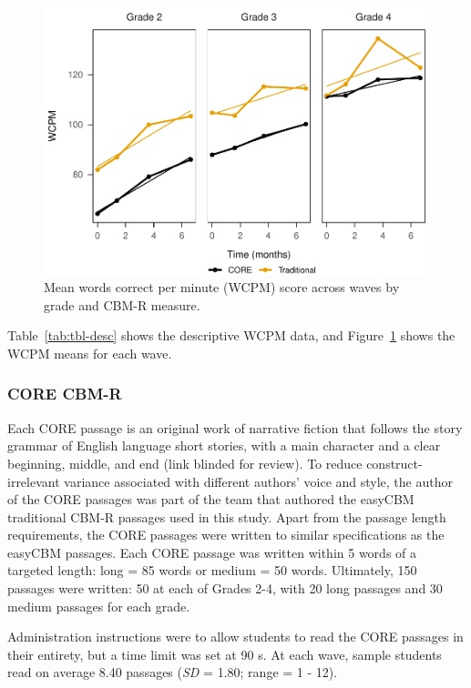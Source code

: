 \documentclass[
  english,
  man, fleqn, noextraspace]{apa6}
\begin{document}
\begin{figure}
\centering
\includegraphics{conseq_validity_manusript_files/figure-latex/fig-means-1.pdf}
\caption{\label{fig:fig-means}Mean words correct per minute (WCPM) score across waves by grade and CBM-R measure.}
\end{figure}

Table~\ref{tab:tbl-desc} shows the descriptive WCPM data, and Figure~\ref{fig:fig-means} shows the WCPM means for each wave.

\hypertarget{core-cbm-r}{%
\subsubsection{CORE CBM-R}\label{core-cbm-r}}

Each CORE passage is an original work of narrative fiction that follows the story grammar of English language short stories, with a main character and a clear beginning, middle, and end (link blinded for review). To reduce construct-irrelevant variance associated with different authors' voice and style, the author of the CORE passages was part of the team that authored the easyCBM traditional CBM-R passages used in this study. Apart from the passage length requirements, the CORE passages were written to similar specifications as the easyCBM passages. Each CORE passage was written within 5 words of a targeted length: long = 85 words or medium = 50 words. Ultimately, 150 passages were written: 50 at each of Grades 2-4, with 20 long passages and 30 medium passages for each grade.

Administration instructions were to allow students to read the CORE passages in their entirety, but a time limit was set at 90 s. At each wave, sample students read on average 8.40 passages (\emph{SD} = 1.80; range = 1 - 12).
\end{document}
